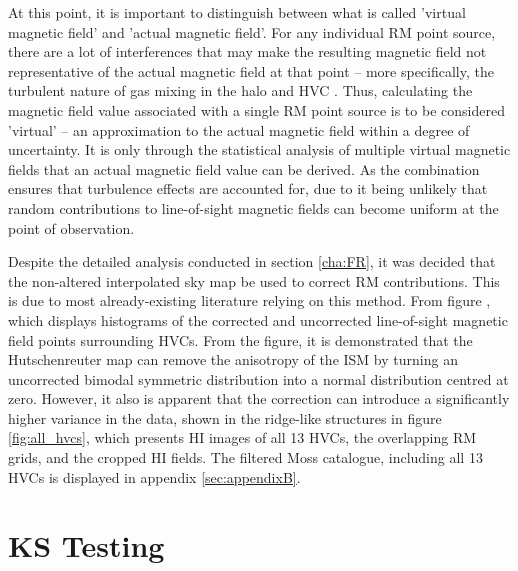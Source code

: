 At this point, it is important to distinguish between what is called 'virtual magnetic field' and 'actual magnetic field'. For any individual RM point source, there are a lot of interferences that may make the resulting magnetic field not representative of the actual magnetic field at that point – more specifically, the turbulent nature of gas mixing in the halo and HVC \citep{ID69, ID30, ID16}. Thus, calculating the magnetic field value associated with a single RM point source is to be considered 'virtual' – an approximation to the actual magnetic field within a degree of uncertainty. It is only through the statistical analysis of multiple virtual magnetic fields that an actual magnetic field value can be derived. As the combination ensures that turbulence effects are accounted for, due to it being unlikely that random contributions to line-of-sight magnetic fields can become uniform at the point of observation.


Despite the detailed analysis conducted in section \ref{cha:FR}, it was decided that the non-altered interpolated sky map be used to correct RM contributions. This is due to most already-existing literature relying on this method. From figure , which displays histograms of the corrected and uncorrected line-of-sight magnetic field points surrounding HVCs. From the figure, it is demonstrated that the Hutschenreuter map can remove the anisotropy of the ISM by turning an uncorrected bimodal symmetric distribution into a normal distribution centred at zero. However, it also is apparent that the correction can introduce a significantly higher variance in the data, shown in the ridge-like structures in figure \ref{fig:all_hvcs}, which presents HI images of all 13 HVCs, the overlapping RM grids, and the cropped HI fields. The filtered Moss catalogue, including all 13 HVCs is displayed in appendix \ref{sec:appendixB}.



\section{KS Testing}
\label{sec:KStest}

